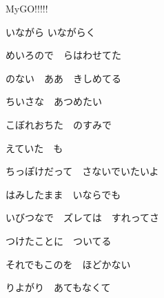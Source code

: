 \documentclass[a4paper,tate,twocolumn,12pt]{ltjtarticle}
\begin{document}
\thispagestyle{empty}

\begin{center}
{\LARGE {}}

{\large MyGO!!!!!}
\end{center}

\vspace{1em}

\begin{flushleft}

\noindent\begin{minipage}{\linewidth}
いながら いながらく

めいろので　らはわせてた

のない　ああ　きしめてる

ちいさな　あつめたい
\end{minipage}

\vspace{2em}

\noindent\begin{minipage}{\linewidth}
こぼれおちた　のすみで

えていた　も
\end{minipage}

\vspace{2em}

\noindent\begin{minipage}{\linewidth}
ちっぽけだって　さないでいたいよ

はみしたまま　いならでも
\end{minipage}

\vspace{2em}

\noindent\begin{minipage}{\linewidth}
いびつなで　ズレては　すれってさ

つけたことに　ついてる

それでもこのを　ほどかない
\end{minipage}

\vspace{2em}

\noindent\begin{minipage}{\linewidth}
りよがり　あてもなくて


\end{minipage}
\end{flushleft}
\end{document}
